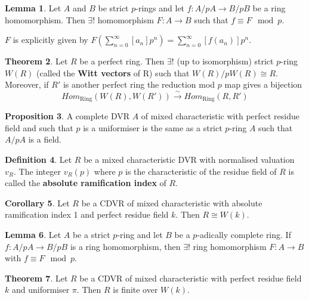 \documentclass[a4paper]{article}
\theoremstyle{definition}
\newtheorem{definition}{Definition}
\theoremstyle{default}
\newtheorem{lemma}[definition]{Lemma}
\newtheorem{theorem}[definition]{Theorem}
\newtheorem{prop}[definition]{Proposition}
\newtheorem{corollary}[definition]{Corollary}
\theoremstyle{remark}
\begin{document}
\begin{lemma}
	Let $A$ and $B$ be strict $p$-rings and let $f: A/pA \to B/pB$ be a ring homomorphism.
	Then $\exists!$ homomorphism $F:A \to B$ such that $f \equiv F \mod p$.
	
	$F$ is explicitly given by $F(\sum_{n=0}^\infty [a_n]p^n) = \sum_{n=0}^\infty [f(a_n)]p^n$.
\end{lemma}

\begin{theorem}
	Let $R$ be a perfect ring.
	Then $\exists!$ (up to isomorphism) strict $p$-ring $W(R)$ (called the \textbf{Witt vectors} of R)
	such that $W(R)/pW(R) \cong R$.
	Moreover, if $R'$ is another perfect ring the reduction mod $p$ map gives a bijection
	$$Hom_{\text{Ring}}(W(R), W(R')) \overset{\sim}{\longrightarrow} Hom_{\text{Ring}}(R, R')$$
\end{theorem}

\begin{prop}
	A complete DVR $A$ of mixed characteristic with perfect residue field and such that $p$ is a uniformiser
	is the same as a strict $p$-ring $A$ such that $A/pA$ is a field.
\end{prop}

\begin{definition}
	Let $R$ be a mixed characteristic DVR with normalised valuation $v_R$.
	The integer $v_R(p)$ where $p$ is the characteristic of the residue field of $R$
	is called the \textbf{absolute ramification index} of $R$.
\end{definition}

\begin{corollary}
	Let $R$ be a CDVR of mixed characteristic with absolute ramification index 1 and perfect residue field $k$.
	Then $R \cong W(k)$.
\end{corollary}
\setcounter{definition}{52}
\renewcommand{\thedefinition}{\arabic{definition}'}
\begin{lemma}
	Let $A$ be a strict $p$-ring and let $B$ be a $p$-adically complete ring.
	If $f: A/pA \to B/pB$ is a ring homomorphism,
	then $\exists!$ ring homomorphism $F:A \to B$ with $f \equiv F \mod p$.
\end{lemma}
\setcounter{definition}{57}
\renewcommand{\thedefinition}{\arabic{definition}}

\begin{theorem}
	Let $R$ be a CDVR of mixed characteristic with perfect residue field $k$ and uniformiser $\pi$.
	Then $R$ is finite over $W(k)$.
\end{theorem}
\end{document}

